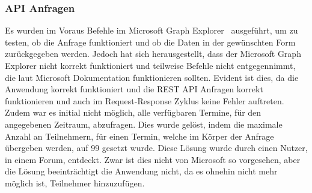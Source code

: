 \subsubsection{API Anfragen}\label{subsubsec:probleme-der-api}
Es wurden im Voraus Befehle im Microsoft Graph Explorer~\cite{Microsoft-Graph-Explorer} ausgeführt, um zu testen, ob die Anfrage funktioniert und ob die Daten in der gewünschten Form zurückgegeben werden.
Jedoch hat sich herausgestellt, dass der Microsoft Graph Explorer nicht korrekt funktioniert und teilweise Befehle nicht entgegennimmt, die laut Microsoft Dokumentation funktionieren sollten.
Evident ist dies, da die Anwendung korrekt funktioniert und die REST API Anfragen korrekt funktionieren und auch im Request-Response Zyklus keine Fehler auftreten.
\newline
\newline
Zudem war es initial nicht möglich, alle verfügbaren Termine, für den angegebenen Zeitraum, abzufragen.
Dies wurde gelöst, indem die maximale Anzahl an Teilnehmern, für einen Termin, welche im Körper der Anfrage übergeben werden, auf 99 gesetzt wurde.
Diese Lösung wurde durch einen Nutzer, in einem Forum, entdeckt.
Zwar ist dies nicht von Microsoft so vorgesehen, aber die Lösung beeinträchtigt die Anwendung nicht, da es ohnehin nicht mehr möglich ist, Teilnehmer hinzuzufügen.
\newline
\newline
